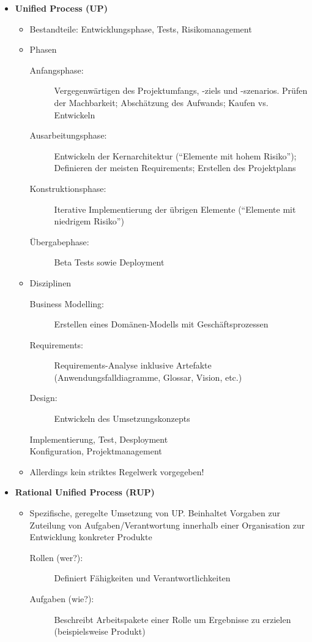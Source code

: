 \begin{itemize}
\begin{minipage}{\linewidth}
	\end{minipage}
	\item \textbf{Unified Process (UP)}
	\begin{itemize}
		\item Bestandteile: Entwicklungsphase, Tests, Risikomanagement
		\item Phasen
		\begin{description}
			\item[Anfangsphase:] Vergegenwärtigen des Projektumfangs, -ziels und -szenarios. Prüfen der Machbarkeit; Abschätzung des Aufwands; Kaufen vs. Entwickeln
			\item[Ausarbeitungsphase:] Entwickeln der Kernarchitektur ("`Elemente mit hohem Risiko"'); Definieren der meisten Requirements; Erstellen des Projektplans
			\item[Konstruktionsphase:] Iterative Implementierung der übrigen Elemente ("`Elemente mit niedrigem Risiko"')
			\item[Übergabephase:] Beta Tests sowie Deployment
		\end{description}
		\item Disziplinen
		\begin{description}
			\item[Business Modelling:] Erstellen eines Domänen-Modells mit Geschäftsprozessen
			\item[Requirements:] Requirements-Analyse inklusive Artefakte (Anwendungsfalldiagramme, Glossar, Vision, etc.)
			\item[Design:] Entwickeln des Umsetzungskonzepts
			\item[Implementierung, Test, Desployment]
			\item[Konfiguration, Projektmanagement]
		\end{description}
		\item Allerdings kein striktes Regelwerk vorgegeben!
	\end{itemize}
	\item \textbf{Rational Unified Process (RUP)}
	\begin{itemize}
		\item Spezifische, geregelte Umsetzung von UP. Beinhaltet Vorgaben zur Zuteilung von Aufgaben/Verantwortung innerhalb einer Organisation zur Entwicklung konkreter Produkte
		\begin{description}
			\item[Rollen (wer?):] Definiert Fähigkeiten und Verantwortlichkeiten
			\item[Aufgaben (wie?):] Beschreibt Arbeitspakete einer Rolle um Ergebnisse zu erzielen (beispielsweise Produkt)

\end{description}
\end{itemize}
\end{itemize}
